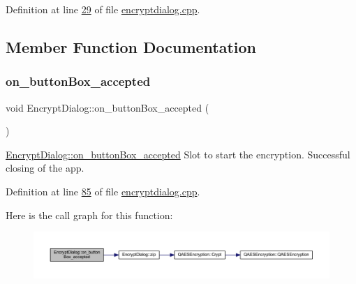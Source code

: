 Definition at line \mbox{\hyperlink{encryptdialog_8cpp_source_l00029}{29}} of file \mbox{\hyperlink{encryptdialog_8cpp_source}{encryptdialog.\+cpp}}.



\subsection{Member Function Documentation}
\mbox{\label{class_encrypt_dialog_a9a998acd37db458eede31f4a9cb16b78}} 
\subsubsection{\texorpdfstring{on\+\_\+button\+Box\+\_\+accepted}{on\_buttonBox\_accepted}}
{\footnotesize\ttfamily void Encrypt\+Dialog\+::on\+\_\+button\+Box\+\_\+accepted (\begin{DoxyParamCaption}{ }\end{DoxyParamCaption})\hspace{0.3cm}{\ttfamily [slot]}}



\mbox{\hyperlink{class_encrypt_dialog_a9a998acd37db458eede31f4a9cb16b78}{Encrypt\+Dialog\+::on\+\_\+button\+Box\+\_\+accepted}} Slot to start the encryption. Successful closing of the app. 



Definition at line \mbox{\hyperlink{encryptdialog_8cpp_source_l00085}{85}} of file \mbox{\hyperlink{encryptdialog_8cpp_source}{encryptdialog.\+cpp}}.

Here is the call graph for this function\+:
\nopagebreak
\begin{figure}[H]
\begin{center}
\leavevmode
\includegraphics[width=350pt]{class_encrypt_dialog_a9a998acd37db458eede31f4a9cb16b78_cgraph}
\end{center}
\end{figure}
\mbox{\label{class_encrypt_dialog_a43deb5fd2be501f4d03582a8ed49e9c2}} 
